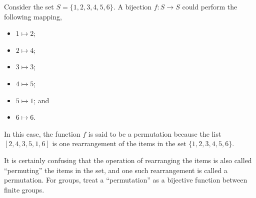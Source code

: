 \begin{example}
    Consider the set $S = \{1, 2, 3, 4, 5, 6\}$. A bijection $f: S \to S$ could perform the following mapping,
    \begin{multicols}{2}
        \begin{itemize}
            \item $1 \mapsto 2$;
            \item $2 \mapsto 4$;
            \item $3 \mapsto 3$;
            \item $4 \mapsto 5$;
            \item $5 \mapsto 1$; and
            \item $6 \mapsto 6$.
        \end{itemize}
    \end{multicols}
    In this case, the function $f$ is said to be a permutation because the list $[2, 4, 3, 5, 1, 6]$ is one rearrangement of the items in the set $\{1, 2, 3, 4, 5, 6\}$.
\end{example}

\begin{remark}
    It is certainly confusing that the operation of rearranging the items is also called ``permuting'' the items in the set, and one such rearrangement is called a permutation. For groups, treat a ``permutation'' as a bijective function between finite groups.
\end{remark}

